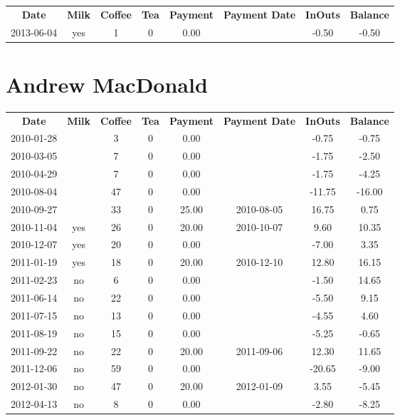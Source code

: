 \begin{center}
\begin{tabular}{cccccccc}
\textbf{Date} & \textbf{Milk} & \textbf{Coffee} & \textbf{Tea} & \textbf{Payment} & \textbf{Payment Date} & \textbf{InOuts} & \textbf{Balance} \\
2013-06-04 & yes & 1 & 0 & 0.00 &  & -0.50 & -0.50
\end{tabular}
\end{center}

\section{Andrew MacDonald}

\begin{center}
\begin{tabular}{cccccccc}
\textbf{Date} & \textbf{Milk} & \textbf{Coffee} & \textbf{Tea} & \textbf{Payment} & \textbf{Payment Date} & \textbf{InOuts} & \textbf{Balance} \\
2010-01-28 &  &  3 & 0 &  0.00 &  &  -0.75 &  -0.75\\ 
2010-03-05 &  &  7 & 0 &  0.00 &  &  -1.75 &  -2.50\\ 
2010-04-29 &  &  7 & 0 &  0.00 &  &  -1.75 &  -4.25\\ 
2010-08-04 &  & 47 & 0 &  0.00 &  & -11.75 & -16.00\\ 
2010-09-27 &  & 33 & 0 & 25.00 & 2010-08-05 &  16.75 &   0.75\\ 
2010-11-04 & yes & 26 & 0 & 20.00 & 2010-10-07 &   9.60 &  10.35\\ 
2010-12-07 & yes & 20 & 0 &  0.00 &  &  -7.00 &   3.35\\ 
2011-01-19 & yes & 18 & 0 & 20.00 & 2010-12-10 &  12.80 &  16.15\\ 
2011-02-23 & no &  6 & 0 &  0.00 &  &  -1.50 &  14.65\\ 
2011-06-14 & no & 22 & 0 &  0.00 &  &  -5.50 &   9.15\\ 
2011-07-15 & no & 13 & 0 &  0.00 &  &  -4.55 &   4.60\\ 
2011-08-19 & no & 15 & 0 &  0.00 &  &  -5.25 &  -0.65\\ 
2011-09-22 & no & 22 & 0 & 20.00 & 2011-09-06 &  12.30 &  11.65\\ 
2011-12-06 & no & 59 & 0 &  0.00 &  & -20.65 &  -9.00\\ 
2012-01-30 & no & 47 & 0 & 20.00 & 2012-01-09 &   3.55 &  -5.45\\ 
2012-04-13 & no &  8 & 0 &  0.00 &  &  -2.80 &  -8.25\\ 

\end{tabular}
\end{center}
